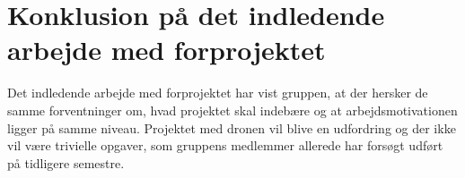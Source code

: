 \documentclass[Main]{subfiles}
\begin{document}
\chapter{Konklusion på det indledende arbejde med forprojektet}


Det indledende arbejde med forprojektet har vist gruppen, at der hersker de samme forventninger om, hvad projektet skal indebære og at arbejdsmotivationen ligger på samme niveau.
Projektet med dronen vil blive en udfordring og der ikke vil være trivielle opgaver, som gruppens medlemmer allerede har forsøgt udført på tidligere semestre.
\end{document}
